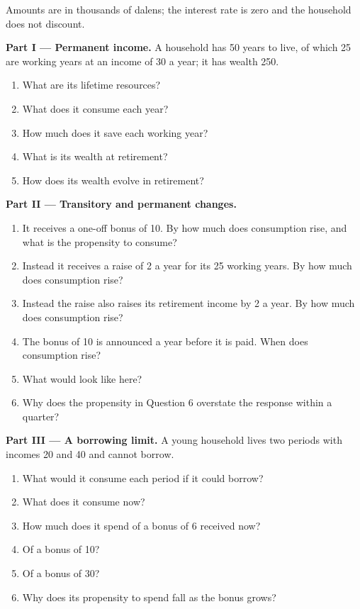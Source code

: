\begin{problem}
\label{pb:b2:consumption:1}
Amounts are in thousands of dalens; the interest rate is zero and the household does not discount.

\medskip
\noindent\textbf{Part I --- Permanent income.} A household has 50 years to live, of which 25 are working years at an income of 30
a year; it has wealth 250.
\begin{enumerate}
  \item What are its lifetime resources?
  \item What does it consume each year?
  \item How much does it save each working year?
  \item What is its wealth at retirement?
  \item How does its wealth evolve in retirement?
\end{enumerate}

\medskip
\noindent\textbf{Part II --- Transitory and permanent changes.}
\begin{enumerate}[resume]
  \item It receives a one-off bonus of 10. By how much does consumption rise, and what is the propensity to consume?
  \item Instead it receives a raise of 2 a year for its 25 working years. By how much does consumption rise?
  \item Instead the raise also raises its retirement income by 2 a year. By how much does consumption rise?
  \item The bonus of 10 is announced a year before it is paid. When does consumption rise?
  \item What would  look like here?
  \item Why does the propensity in Question 6 overstate the response within a quarter?
\end{enumerate}

\medskip
\noindent\textbf{Part III --- A borrowing limit.} A young household lives two periods with incomes 20 and 40 and cannot
borrow.
\begin{enumerate}[resume]
  \item What would it consume each period if it could borrow?
  \item What does it consume now?
  \item How much does it spend of a bonus of 6 received now?
  \item Of a bonus of 10?
  \item Of a bonus of 30?
  \item Why does its propensity to spend fall as the bonus grows?
\end{enumerate}


\end{problem}
